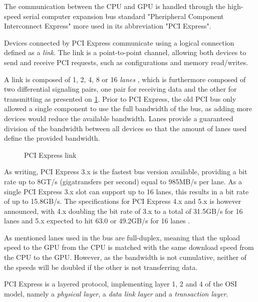 The communication between the CPU and GPU is handled through the high-speed serial computer expansion bus standard "Pheripheral Component Interconnect Express" more used in its abbreviation "PCI Express".

Devices connected by PCI Express communicate using a logical connection defined as a \textit{link}.
The link is a point-to-point channel, allowing both devices to send and receive PCI requests, such as configurations and memory read/writes.

A link is composed of 1, 2, 4, 8 or 16 \textit{lanes} \cite{wiki:pci}, which is furthermore composed of two differential signaling pairs, one pair for receiving data and the other for transmitting as presented on \cref{fig:hw-pci-express}.
Prior to PCI Express, the old PCI bus only allowed a single component to use the full bandwidth of the bus, as adding more devices would reduce the available bandwidth.
Lanes provide a guaranteed division of the bandwidth between all devices so that the amount of lanes used define the provided bandwidth.

\begin{figure}[ht]
	\centering
	\caption{PCI Express link}
	\label{fig:hw-pci-express}
\end{figure}



As writing, PCI Express 3.x is the fastest bus version available, providing a bit rate up to 8GT/s (gigatransfers per second) equal to 985MB/s per lane.
As a single PCI Express 3.x slot can support up to 16 lanes, this results in a bit rate of up to 15.8GB/s.
The specifications for PCI Express 4.x and 5.x is however announced, with 4.x doubling the bit rate of 3.x to a total of 31.5GB/s for 16 lanes and 5.x expected to hit 63.0 or 49.2GB/s for 16 lanes \cite{wiki:pci}.

As mentioned lanes used in the bus are full-duplex, meaning that the upload speed to the GPU from the CPU is matched with the same download speed from the CPU to the GPU.
However, as the bandwidth is not cumulative, neither of the speeds will be doubled if the other is not transferring data.

PCI Express is a layered protocol, implementing layer 1, 2 and 4 of the OSI model, namely a \textit{physical layer},  a \textit{data link layer} and a \textit{transaction layer}.

